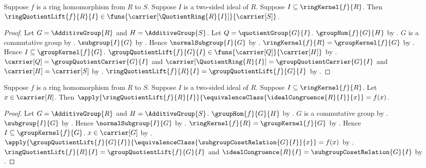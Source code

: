 \begin{proposition}\label{ring_quotient_lift_type}
    Suppose $f$ is a ring homomorphism from $R$ to $S$.
    Suppose $I$ is a two-sided ideal of $R$.
    Suppose $I\subseteq\ringKernel{f}{R}$.
    Then $\ringQuotientLift{f}{R}{I}\in
        \funs{\carrier[\QuotientRing{R}{I}]}{\carrier[S]}$.
\end{proposition}
\begin{proof}
    Let $G=\AdditiveGroup{R}$ and $H=\AdditiveGroup{S}$.
    Let $Q=\quotientGroup{G}{I}$.
    $\groupHom{f}{G}{H}$ by
        .
    $G$ is a commutative group by
        .
    $\subgroup{I}{G}$ by
        .
    Hence $\normalSubgroup{I}{G}$ by
        .
    $\ringKernel{f}{R}=\groupKernel{f}{G}$ by .
    Hence $I\subseteq\groupKernel{f}{G}$.
    $\groupQuotientLift{f}{G}{I}\in
        \funs{\carrier[Q]}{\carrier[H]}$ by
        .
    $\carrier[Q]=\groupQuotientCarrier{G}{I}$ and
        $\carrier[\QuotientRing{R}{I}]=\groupQuotientCarrier{G}{I}$ and
        $\carrier[H]=\carrier[S]$ by
        .
    $\ringQuotientLift{f}{R}{I}=\groupQuotientLift{f}{G}{I}$ by
        .
\end{proof}

\begin{proposition}\label{ring_quotient_lift_apply}
    Suppose $f$ is a ring homomorphism from $R$ to $S$.
    Suppose $I$ is a two-sided ideal of $R$.
    Suppose $I\subseteq\ringKernel{f}{R}$.
    Let $x\in\carrier[R]$.
    Then
        $\apply{\ringQuotientLift{f}{R}{I}}
            {\equivalenceClass{\idealCongruence{R}{I}}{x}}=f(x)$.
\end{proposition}
\begin{proof}
    Let $G=\AdditiveGroup{R}$ and $H=\AdditiveGroup{S}$.
    $\groupHom{f}{G}{H}$ by
        .
    $G$ is a commutative group by
        .
    $\subgroup{I}{G}$ by
        .
    Hence $\normalSubgroup{I}{G}$ by
        .
    $\ringKernel{f}{R}=\groupKernel{f}{G}$ by .
    Hence $I\subseteq\groupKernel{f}{G}$.
    $x\in\carrier[G]$ by .
    $\apply{\groupQuotientLift{f}{G}{I}}
        {\equivalenceClass{\subgroupCosetRelation{G}{I}}{x}}
        =f(x)$ by .
    $\ringQuotientLift{f}{R}{I}=\groupQuotientLift{f}{G}{I}$ and
        $\idealCongruence{R}{I}=\subgroupCosetRelation{G}{I}$ by
        .
\end{proof}

